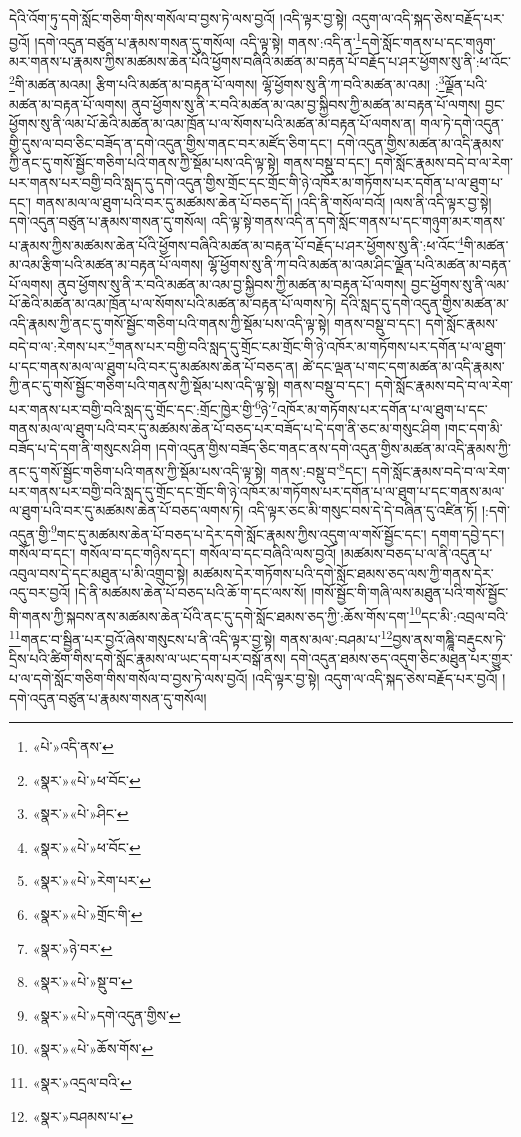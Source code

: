 དེའི་འོག་ཏུ་དགེ་སློང་གཅིག་གིས་གསོལ་བ་བྱས་ཏེ་ལས་བྱའོ། །འདི་ལྟར་བྱ་སྟེ། འདུག་ལ་འདི་སྐད་ཅེས་བརྗོད་པར་བྱའོ། །དགེ་འདུན་བཙུན་པ་རྣམས་གསན་དུ་གསོལ། འདི་ལྟ་སྟེ། གནས་:འདི་ན་\footnote{«པེ་»འདི་ནས་}དགེ་སློང་གནས་པ་དང་གཉུག་མར་གནས་པ་རྣམས་ཀྱིས་མཚམས་ཆེན་པོའི་ཕྱོགས་བཞིའི་མཚན་མ་བརྟན་པོ་བརྗོད་པ་ཤར་ཕྱོགས་སུ་ནི་:ཕ་འོང་\footnote{«སྣར་»«པེ་»ཕ་བོང་}གི་མཚན་མའམ། རྩིག་པའི་མཚན་མ་བརྟན་པོ་ལགས། ལྷོ་ཕྱོགས་སུ་ནི་ཀ་བའི་མཚན་མ་འམ། :\footnote{«སྣར་»«པེ་»ཤིང་}ལྗོན་པའི་མཚན་མ་བརྟན་པོ་ལགས། ནུབ་ཕྱོགས་སུ་ནི་ར་བའི་མཚན་མ་འམ་བྱ་སྐྱིབས་ཀྱི་མཚན་མ་བརྟན་པོ་ལགས། བྱང་ཕྱོགས་སུ་ནི་ལམ་པོ་ཆེའི་མཚན་མ་འམ་ཁྲོན་པ་ལ་སོགས་པའི་མཚན་མ་བརྟན་པོ་ལགས་ན། གལ་ཏེ་དགེ་འདུན་གྱི་དུས་ལ་བབ་ཅིང་བཟོད་ན་དགེ་འདུན་གྱིས་གནང་བར་མཛོད་ཅིག་དང་། དགེ་འདུན་གྱིས་མཚན་མ་འདི་རྣམས་ཀྱི་ནང་དུ་གསོ་སྦྱོང་གཅིག་པའི་གནས་ཀྱི་སྡོམ་པས་འདི་ལྟ་སྟེ། གནས་བསྡུ་བ་དང་། དགེ་སློང་རྣམས་བདེ་བ་ལ་རེག་པར་གནས་པར་བགྱི་བའི་སླད་དུ་དགེ་འདུན་གྱིས་གྲོང་དང་གྲོང་གི་ཉེ་འཁོར་མ་གཏོགས་པར་དགོན་པ་ལ་ཐུག་པ་དང་། གནས་མལ་ལ་ཐུག་པའི་བར་དུ་མཚམས་ཆེན་པོ་བཅད་དོ། །འདི་ནི་གསོལ་བའོ། །ལས་ནི་འདི་ལྟར་བྱ་སྟེ། དགེ་འདུན་བཙུན་པ་རྣམས་གསན་དུ་གསོལ། འདི་ལྟ་སྟེ་གནས་འདི་ན་དགེ་སློང་གནས་པ་དང་གཉུག་མར་གནས་པ་རྣམས་ཀྱིས་མཚམས་ཆེན་པོའི་ཕྱོགས་བཞིའི་མཚན་མ་བརྟན་པོ་བརྗོད་པ་ཤར་ཕྱོགས་སུ་ནི་:ཕ་འོང་\footnote{«སྣར་»«པེ་»ཕ་བོང་}གི་མཚན་མ་འམ་རྩིག་པའི་མཚན་མ་བརྟན་པོ་ལགས། ལྷོ་ཕྱོགས་སུ་ནི་ཀ་བའི་མཚན་མ་འམ་ཤིང་ལྗོན་པའི་མཚན་མ་བརྟན་པོ་ལགས། ནུབ་ཕྱོགས་སུ་ནི་ར་བའི་མཚན་མ་འམ་བྱ་སྐྱིབས་ཀྱི་མཚན་མ་བརྟན་པོ་ལགས། བྱང་ཕྱོགས་སུ་ནི་ལམ་པོ་ཆེའི་མཚན་མ་འམ་ཁྲོན་པ་ལ་སོགས་པའི་མཚན་མ་བརྟན་པོ་ལགས་ཏེ། དེའི་སླད་དུ་དགེ་འདུན་གྱིས་མཚན་མ་འདི་རྣམས་ཀྱི་ནང་དུ་གསོ་སྦྱོང་གཅིག་པའི་གནས་ཀྱི་སྡོམ་པས་འདི་ལྟ་སྟེ། གནས་བསྡུ་བ་དང་། དགེ་སློང་རྣམས་བདེ་བ་ལ་:རེགས་པར་\footnote{«སྣར་»«པེ་»རེག་པར་}གནས་པར་བགྱི་བའི་སླད་དུ་གྲོང་ངམ་གྲོང་གི་ཉེ་འཁོར་མ་གཏོགས་པར་དགོན་པ་ལ་ཐུག་པ་དང་གནས་མལ་ལ་ཐུག་པའི་བར་དུ་མཚམས་ཆེན་པོ་བཅད་ན། ཚེ་དང་ལྡན་པ་གང་དག་མཚན་མ་འདི་རྣམས་ཀྱི་ནང་དུ་གསོ་སྦྱོང་གཅིག་པའི་གནས་ཀྱི་སྡོམ་པས་འདི་ལྟ་སྟེ། གནས་བསྡུ་བ་དང་། དགེ་སློང་རྣམས་བདེ་བ་ལ་རེག་པར་གནས་པར་བགྱི་བའི་སླད་དུ་གྲོང་དང་:གྲོང་ཁྱེར་གྱི་\footnote{«སྣར་»«པེ་»གྲོང་གི་}ཉེ་\footnote{«སྣར་»ཉེ་བར་}འཁོར་མ་གཏོགས་པར་དགོན་པ་ལ་ཐུག་པ་དང་གནས་མལ་ལ་ཐུག་པའི་བར་དུ་མཚམས་ཆེན་པོ་བཅད་པར་བཟོད་པ་དེ་དག་ནི་ཅང་མ་གསུང་ཤིག །གང་དག་མི་བཟོད་པ་དེ་དག་ནི་གསུངས་ཤིག །དགེ་འདུན་གྱིས་བཟོད་ཅིང་གནང་ནས་དགེ་འདུན་གྱིས་མཚན་མ་འདི་རྣམས་ཀྱི་ནང་དུ་གསོ་སྦྱོང་གཅིག་པའི་གནས་ཀྱི་སྡོམ་པས་འདི་ལྟ་སྟེ། གནས་:བསྡུ་བ་\footnote{«སྣར་»«པེ་»སྡུ་བ་}དང་། དགེ་སློང་རྣམས་བདེ་བ་ལ་རེག་པར་གནས་པར་བགྱི་བའི་སླད་དུ་གྲོང་དང་གྲོང་གི་ཉེ་འཁོར་མ་གཏོགས་པར་དགོན་པ་ལ་ཐུག་པ་དང་གནས་མལ་ལ་ཐུག་པའི་བར་དུ་མཚམས་ཆེན་པོ་བཅད་ལགས་ཏེ། འདི་ལྟར་ཅང་མི་གསུང་བས་དེ་དེ་བཞིན་དུ་འཛིན་ཏོ། །:དགེ་འདུན་གྱི་\footnote{«སྣར་»«པེ་»དགེ་འདུན་གྱིས་}གང་དུ་མཚམས་ཆེན་པོ་བཅད་པ་དེར་དགེ་སློང་རྣམས་ཀྱིས་འདུག་ལ་གསོ་སྦྱོང་དང་། དགག་དབྱེ་དང་། གསོལ་བ་དང་། གསོལ་བ་དང་གཉིས་དང་། གསོལ་བ་དང་བཞིའི་ལས་བྱའོ། །མཚམས་བཅད་པ་ལ་ནི་འདུན་པ་འབུལ་བས་དེ་དང་མཐུན་པ་མི་འགྲུབ་སྟེ། མཚམས་དེར་གཏོགས་པའི་དགེ་སློང་ཐམས་ཅད་ལས་ཀྱི་གནས་དེར་འདུ་བར་བྱའོ། །དེ་ནི་མཚམས་ཆེན་པོ་བཅད་པའི་ཆོ་ག་དང་ལས་སོ། །གསོ་སྦྱོང་གི་གཞི་ལས་མཐུན་པའི་གསོ་སྦྱོང་གི་གནས་ཀྱི་སྐབས་ནས་མཚམས་ཆེན་པོའི་ནང་དུ་དགེ་སློང་ཐམས་ཅད་ཀྱི་:ཆོས་གོས་དག་\footnote{«སྣར་»«པེ་»ཆོས་གོས་}དང་མི་:འབྲལ་བའི་\footnote{«སྣར་»འདྲལ་བའི་}གནང་བ་སྦྱིན་པར་བྱའོ་ཞེས་གསུངས་པ་ནི་འདི་ལྟར་བྱ་སྟེ། གནས་མལ་:བཤམ་པ་\footnote{«སྣར་»བཤམས་པ་}བྱས་ནས་གཎྜཱི་བརྡུངས་ཏེ་དྲིས་པའི་ཚིག་གིས་དགེ་སློང་རྣམས་ལ་ཡང་དག་པར་བསྒོ་ནས། དགེ་འདུན་ཐམས་ཅད་འདུག་ཅིང་མཐུན་པར་གྱུར་པ་ལ་དགེ་སློང་གཅིག་གིས་གསོལ་བ་བྱས་ཏེ་ལས་བྱའོ། །འདི་ལྟར་བྱ་སྟེ། འདུག་ལ་འདི་སྐད་ཅེས་བརྗོད་པར་བྱའོ། །དགེ་འདུན་བཙུན་པ་རྣམས་གསན་དུ་གསོལ། 
